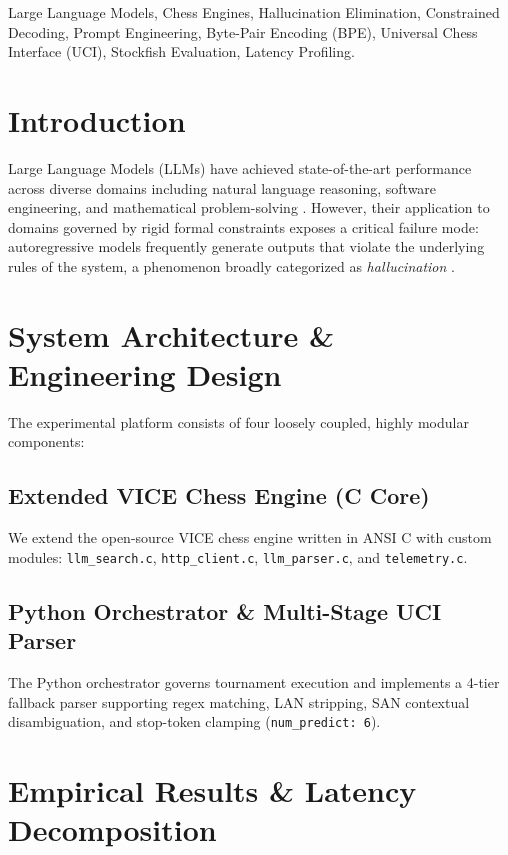 \documentclass[conference]{IEEEtran}
\begin{document}
\begin{IEEEkeywords}
Large Language Models, Chess Engines, Hallucination Elimination, Constrained Decoding, Prompt Engineering, Byte-Pair Encoding (BPE), Universal Chess Interface (UCI), Stockfish Evaluation, Latency Profiling.
\end{IEEEkeywords}

\section{Introduction}
Large Language Models (LLMs) have achieved state-of-the-art performance across diverse domains including natural language reasoning, software engineering, and mathematical problem-solving \cite{wei2022chain}. However, their application to domains governed by rigid formal constraints exposes a critical failure mode: autoregressive models frequently generate outputs that violate the underlying rules of the system, a phenomenon broadly categorized as \textit{hallucination} \cite{ji2023survey}.

\section{System Architecture \& Engineering Design}
The experimental platform consists of four loosely coupled, highly modular components:
\subsection{Extended VICE Chess Engine (C Core)}
We extend the open-source VICE chess engine \cite{allbert2013vice} written in ANSI C with custom modules: \texttt{llm\_search.c}, \texttt{http\_client.c}, \texttt{llm\_parser.c}, and \texttt{telemetry.c}.

\subsection{Python Orchestrator \& Multi-Stage UCI Parser}
The Python orchestrator governs tournament execution and implements a 4-tier fallback parser supporting regex matching, LAN stripping, SAN contextual disambiguation, and stop-token clamping (\texttt{num\_predict: 6}).

\section{Empirical Results \& Latency Decomposition}
\end{document}

